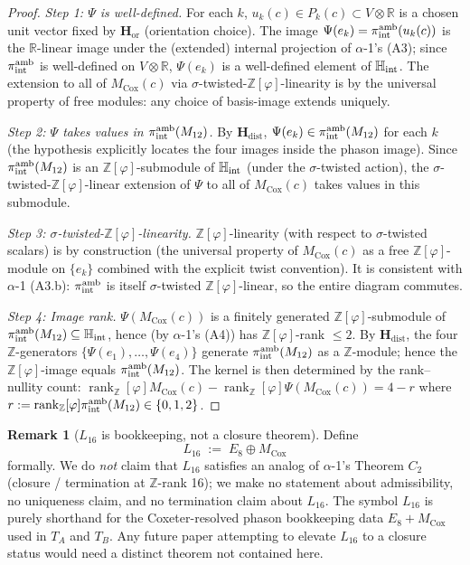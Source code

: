 \documentclass[11pt, a4paper]{amsart}
\theoremstyle{definition}
\newtheorem{remark}[theorem]{Remark}
\newcommand{\R}{\mathbb{R}}
\newcommand{\Z}{\mathbb{Z}}
\newcommand{\HH}{\mathbb{H}}
\newcommand{\rk}{\operatorname{rank}}
\newcommand{\Hor}{\mathbf{H}_{\mathrm{or}}}
\newcommand{\Hdist}{\mathbf{H}_{\mathrm{dist}}}
\newcommand{\Ophi}{\mathbb{Z}[\varphi]}
\newcommand{\Mcox}{M_{\mathrm{Cox}}}
\newcommand{\Mtw}{M_{12}}
\begin{document}
\begin{proof}
\emph{Step 1: $\Psi$ is well-defined.} For each $k$, $u_k(c)
\in P_k(c) \subset V \otimes \R$ is a chosen unit vector
fixed by $\Hor$ (orientation choice). The image $\Psi(e_k) =
\pi_{\rm int}^{\rm amb}(u_k(c))$ is the $\R$-linear image
under the (extended) internal projection of $\alpha$-1's
(A3); since $\pi_{\rm int}^{\rm amb}$ is well-defined on
$V \otimes \R$, $\Psi(e_k)$ is a well-defined element of
$\HH_{\rm int}$. The extension to all of $\Mcox(c)$ via
$\sigma$-twisted-$\Ophi$-linearity is by the universal
property of free modules: any choice of basis-image
extends uniquely.

\emph{Step 2: $\Psi$ takes values in $\pi_{\rm int}^{\rm
amb}(\Mtw)$.} By $\Hdist$, $\Psi(e_k) \in \pi_{\rm
int}^{\rm amb}(\Mtw)$ for each $k$ (the hypothesis explicitly
locates the four images inside the phason image). Since
$\pi_{\rm int}^{\rm amb}(\Mtw)$ is an $\Ophi$-submodule of
$\HH_{\rm int}$ (under the $\sigma$-twisted action), the
$\sigma$-twisted-$\Ophi$-linear extension of $\Psi$ to all
of $\Mcox(c)$ takes values in this submodule.

\emph{Step 3: $\sigma$-twisted-$\Ophi$-linearity.}
$\Ophi$-linearity (with respect to $\sigma$-twisted
scalars) is by construction (the universal property of
$\Mcox(c)$ as a free $\Ophi$-module on $\{e_k\}$ combined
with the explicit twist convention). It is consistent with
$\alpha$-1 (A3.b): $\pi_{\rm int}^{\rm amb}$ is itself
$\sigma$-twisted $\Ophi$-linear, so the entire diagram
commutes.

\emph{Step 4: Image rank.}
$\Psi(\Mcox(c))$ is a finitely generated $\Ophi$-submodule
of $\pi_{\rm int}^{\rm amb}(\Mtw) \subseteq \HH_{\rm int}$,
hence (by $\alpha$-1's (A4)) has $\Ophi$-rank $\leq 2$. By
$\Hdist$, the four $\Z$-generators $\{\Psi(e_1), \ldots,
\Psi(e_4)\}$ generate $\pi_{\rm int}^{\rm amb}(\Mtw)$ as a
$\Z$-module; hence the $\Ophi$-image equals
$\pi_{\rm int}^{\rm amb}(\Mtw)$. The kernel is then
determined by the rank--nullity count: $\rk_\Ophi \Mcox(c)
- \rk_\Ophi \Psi(\Mcox(c)) = 4 - r$ where $r := \rk_\Ophi
\pi_{\rm int}^{\rm amb}(\Mtw) \in \{0, 1, 2\}$.
\end{proof}

\begin{remark}[$L_{16}$ is bookkeeping, not a closure theorem]
\label{rmk:L16-bookkeeping}
Define
\[
  L_{16} \;:=\; E_8 \oplus \Mcox
\]
formally. We do \emph{not} claim that $L_{16}$ satisfies an
analog of $\alpha$-1's Theorem $C_2$ (closure / termination at
$\Z$-rank 16); we make no statement about admissibility,
no uniqueness claim, and no termination claim about $L_{16}$.
The symbol $L_{16}$ is purely shorthand for the Coxeter-resolved
phason bookkeeping data $E_8 + \Mcox$ used in
$T_A$ and $T_B$. Any future paper attempting to elevate
$L_{16}$ to a closure status would need a distinct theorem
not contained here.
\end{remark}
\end{document}
